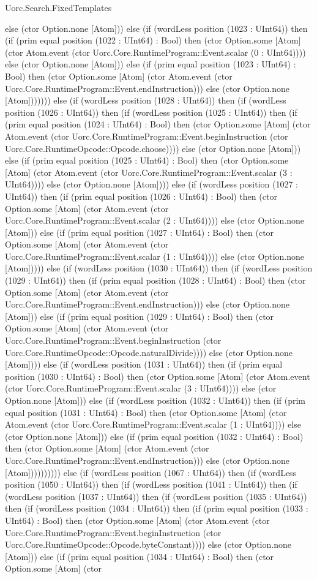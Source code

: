 \begin{lexlean}{Uorc.Search.FixedTemplates}
\begin{semanticmodule}
{else (ctor Option.none [Atom])) else (if (wordLess position (1023 : UInt64)) then (if (prim equal position (1022 : UInt64) : Bool) then (ctor Option.some [Atom] (ctor Atom.event (ctor Uorc.Core.RuntimeProgram::Event.scalar (0 : UInt64)))) else (ctor Option.none [Atom])) else (if (prim equal position (1023 : UInt64) : Bool) then (ctor Option.some [Atom] (ctor Atom.event (ctor Uorc.Core.RuntimeProgram::Event.endInstruction))) else (ctor Option.none [Atom])))))) else (if (wordLess position (1028 : UInt64)) then (if (wordLess position (1026 : UInt64)) then (if (wordLess position (1025 : UInt64)) then (if (prim equal position (1024 : UInt64) : Bool) then (ctor Option.some [Atom] (ctor Atom.event (ctor Uorc.Core.RuntimeProgram::Event.beginInstruction (ctor Uorc.Core.RuntimeOpcode::Opcode.choose)))) else (ctor Option.none [Atom])) else (if (prim equal position (1025 : UInt64) : Bool) then (ctor Option.some [Atom] (ctor Atom.event (ctor Uorc.Core.RuntimeProgram::Event.scalar (3 : UInt64)))) else (ctor Option.none [Atom]))) else (if (wordLess position (1027 : UInt64)) then (if (prim equal position (1026 : UInt64) : Bool) then (ctor Option.some [Atom] (ctor Atom.event (ctor Uorc.Core.RuntimeProgram::Event.scalar (2 : UInt64)))) else (ctor Option.none [Atom])) else (if (prim equal position (1027 : UInt64) : Bool) then (ctor Option.some [Atom] (ctor Atom.event (ctor Uorc.Core.RuntimeProgram::Event.scalar (1 : UInt64)))) else (ctor Option.none [Atom])))) else (if (wordLess position (1030 : UInt64)) then (if (wordLess position (1029 : UInt64)) then (if (prim equal position (1028 : UInt64) : Bool) then (ctor Option.some [Atom] (ctor Atom.event (ctor Uorc.Core.RuntimeProgram::Event.endInstruction))) else (ctor Option.none [Atom])) else (if (prim equal position (1029 : UInt64) : Bool) then (ctor Option.some [Atom] (ctor Atom.event (ctor Uorc.Core.RuntimeProgram::Event.beginInstruction (ctor Uorc.Core.RuntimeOpcode::Opcode.naturalDivide)))) else (ctor Option.none [Atom]))) else (if (wordLess position (1031 : UInt64)) then (if (prim equal position (1030 : UInt64) : Bool) then (ctor Option.some [Atom] (ctor Atom.event (ctor Uorc.Core.RuntimeProgram::Event.scalar (3 : UInt64)))) else (ctor Option.none [Atom])) else (if (wordLess position (1032 : UInt64)) then (if (prim equal position (1031 : UInt64) : Bool) then (ctor Option.some [Atom] (ctor Atom.event (ctor Uorc.Core.RuntimeProgram::Event.scalar (1 : UInt64)))) else (ctor Option.none [Atom])) else (if (prim equal position (1032 : UInt64) : Bool) then (ctor Option.some [Atom] (ctor Atom.event (ctor Uorc.Core.RuntimeProgram::Event.endInstruction))) else (ctor Option.none [Atom]))))))))) else (if (wordLess position (1067 : UInt64)) then (if (wordLess position (1050 : UInt64)) then (if (wordLess position (1041 : UInt64)) then (if (wordLess position (1037 : UInt64)) then (if (wordLess position (1035 : UInt64)) then (if (wordLess position (1034 : UInt64)) then (if (prim equal position (1033 : UInt64) : Bool) then (ctor Option.some [Atom] (ctor Atom.event (ctor Uorc.Core.RuntimeProgram::Event.beginInstruction (ctor Uorc.Core.RuntimeOpcode::Opcode.byteConstant)))) else (ctor Option.none [Atom])) else (if (prim equal position (1034 : UInt64) : Bool) then (ctor Option.some [Atom] (ctor }
\end{semanticmodule}
\end{lexlean}
